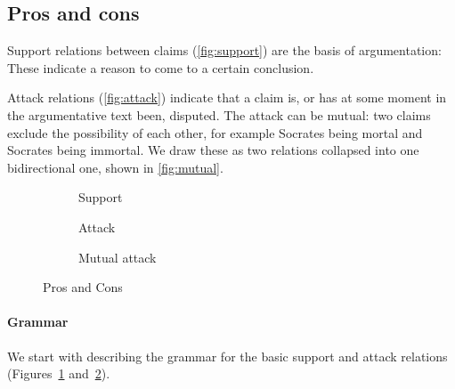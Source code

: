 \subsection{Pros and cons}
Support relations between claims (\autoref{fig:support}) are the basis of argumentation: These indicate a reason to come to a certain conclusion.

Attack relations (\autoref{fig:attack}) indicate that a claim is, or has at some moment in the argumentative text been, disputed. The attack can be mutual: two claims exclude the possibility of each other, for example Socrates being mortal and Socrates being immortal. We draw these as two relations collapsed into one bidirectional one, shown in \autoref{fig:mutual}.

\begin{figure}[ht!]
    \centering
    \begin{subfigure}[b]{0.3\textwidth}
        \centering
        \caption{Support}
        \label{fig:support}
    \end{subfigure}
    \begin{subfigure}[b]{0.3\textwidth}
        \centering
        \caption{Attack}
        \label{fig:attack}
    \end{subfigure}
    \begin{subfigure}[b]{0.3\textwidth}
        \centering
        \caption{Mutual attack}
        \label{fig:mutual}
    \end{subfigure}
    \caption{Pros and Cons}
    \label{fig:proscons}
\end{figure}

\paragraph{Grammar} We start with describing the grammar for the basic support and attack relations (Figures~\ref{fig:support} and~\ref{fig:attack}).

